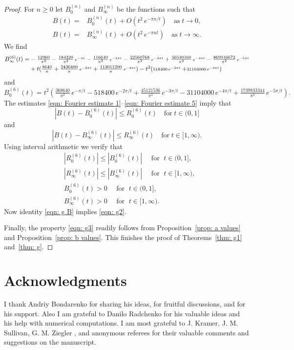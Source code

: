 \documentclass{scrartcl}
\begin{document}
\begin{proof}
\noindent For $n\geq 0$ let $B_0^{(n)}$ and  $B_{\infty}^{(n)}$ be the functions  such that
\begin{align*}
 B(t)=&B_0^{(n)}(t)+O(t^2\,e^{-\pi n /t})\quad\mbox{as}\;t\to0,\\
 B(t)=&B_\infty^{(n)}(t)+O(t^2\,e^{-\pi n t})\quad\mbox{as}\;t\to\infty.
\end{align*}
We find
\begin{align*}B_\infty^{(6)}(t)=&-\tfrac{12960}{\pi ^2}-\tfrac{184320}{\pi ^2}\,\scriptstyle e^{-\pi  t}\displaystyle-\tfrac{116640}{\pi ^2} \,\scriptstyle e^{-2\pi  t}\displaystyle-\tfrac{22560768}{\pi ^2}\,\scriptstyle e^{-3\pi  t}\displaystyle+\tfrac{56540160}{\pi ^2}\,\scriptstyle e^{-4\pi  t}\displaystyle-\tfrac{869916672 }{\pi ^2} \,\scriptstyle e^{-5\pi  t}\displaystyle\\&+t(\tfrac{8640 }{\pi }+\tfrac{2436480}{\pi }\,\scriptstyle e^{-2\pi  t}\displaystyle+\tfrac{113011200 }{\pi }\,\scriptstyle e^{-4\pi  t}\textstyle)-t^2(\scriptstyle518400\,\scriptstyle e^{-2\pi  t}\displaystyle+\scriptstyle31104000\,\scriptstyle e^{-4\pi  t}\displaystyle)
\end{align*}
and
$$B_0^{(6)}(t)= t^2(\tfrac{368640}{\pi ^2}\, e^{-\pi/t}-518400\, e^{-2 \pi /t}+\tfrac{45121536 }{\pi ^2}\,e^{-3 \pi/t}-31104000\, e^{-4 \pi/t}+\tfrac{1739833344 }{\pi ^2}\,e^{-5 \pi/t}) .$$
The estimates \eqref{eqn: Fourier estimate 1}--\eqref{eqn: Fourier estimate 5} imply that $$\left|B(t)-B_0^{(6)}(t)\right|\leq R_0^{(6)}(t)\quad\mbox{for}\;t\in(0,1]$$
and
$$\left|B(t)-B_\infty^{(6)}(t)\right|\leq R_\infty^{(6)}(t)\quad\mbox{for}\;t\in[1,\infty).$$
Using interval arithmetic we verify that
\begin{align*}
&\left|R_0^{(6)}(t)\right|\leq\left|B_0^{(6)}(t)\right|\quad\mbox{ for }\;t\in(0,1],\\
&\left|R_\infty^{(6)}(t)\right|\leq\left|B_\infty^{(6)}(t)\right|\quad\mbox{ for }\;t\in[1,\infty),\\
&B_0^{(6)}(t)>0\quad\mbox{ for }\;t\in(0,1],\\
&B_\infty^{(6)}(t)>0\quad\mbox{ for }\;t\in[1,\infty).
\end{align*}
Now identity \eqref{eqn: g B} implies \eqref{eqn: g2}.

Finally, the property \eqref{eqn: g3} readily follows from Proposition~\ref{prop: a values} and Proposition~\ref{prop: b values}.
This finishes the proof of Theorems~\ref{thm: g1} and~\ref{thm: g}.
 \end{proof}

 \section*{Acknowledgments}
I  thank Andriy Bondarenko for sharing his ideas, for fruitful discussions, and for his support. Also I am grateful to Danilo Radchenko for his valuable ideas and his help with numerical computations. I am most grateful to J. Kramer, J. M. Sullivan, G. M. Ziegler , and anonymous referees for their valuable comments and suggestions on the manuscript.
\end{document}
